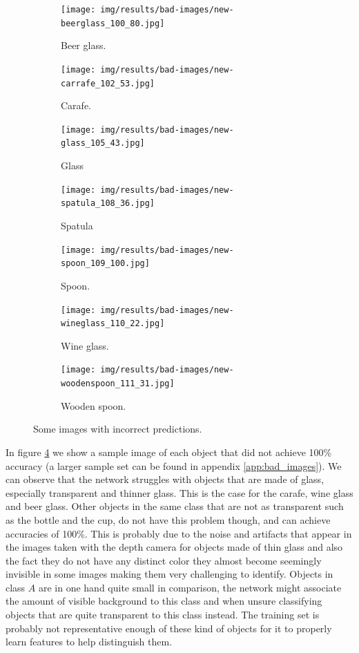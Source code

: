 \begin{figure}
	\centering
	\begin{subfigure}[b]{0.3\textwidth}
		\texttt{[image: img/results/bad-images/new-beerglass\_100\_80.jpg]}
		\caption{Beer glass.}
	\end{subfigure}
	\begin{subfigure}[b]{0.3\textwidth}
		\texttt{[image: img/results/bad-images/new-carrafe\_102\_53.jpg]}
		\caption{Carafe.}
	\end{subfigure}
	\begin{subfigure}[b]{0.3\textwidth}
		\texttt{[image: img/results/bad-images/new-glass\_105\_43.jpg]}
		\caption{Glass}
	\end{subfigure}
	\begin{subfigure}[b]{0.3\textwidth}
		\texttt{[image: img/results/bad-images/new-spatula\_108\_36.jpg]}
		\caption{Spatula}
		\label{fig:results_bad_images__spatula}
	\end{subfigure}
	\begin{subfigure}[b]{0.3\textwidth}
		\texttt{[image: img/results/bad-images/new-spoon\_109\_100.jpg]}
		\caption{Spoon.}
		\label{fig:results_bad_images__spoon}
	\end{subfigure}
	\begin{subfigure}[b]{0.3\textwidth}
		\texttt{[image: img/results/bad-images/new-wineglass\_110\_22.jpg]}
		\caption{Wine glass.}
	\end{subfigure}
	\begin{subfigure}[b]{0.3\textwidth}
		\texttt{[image: img/results/bad-images/new-woodenspoon\_111\_31.jpg]}
		\caption{Wooden spoon.}
		\label{fig:results_bad_images__wooden_spoon}
	\end{subfigure}
	\caption{Some images with incorrect predictions.}
	\label{fig:results_bad_images}
\end{figure}


In figure \ref{fig:results_bad_images} we show a sample image of each object that did not achieve 100\% accuracy (a larger sample set can be found in appendix \ref{app:bad_images}). We can observe that the network struggles with objects that are made of glass, especially transparent and thinner glass. This is the case for the carafe, wine glass and beer glass. Other objects in the same class that are not as transparent such as the bottle and the cup, do not have this problem though, and can achieve accuracies of 100\%. This is probably due to the noise and artifacts that appear in the images taken with the depth camera for objects made of thin glass and also the fact they do not have any distinct color they almost become seemingly invisible in some images making them very challenging to identify. Objects in class \(A\) are in one hand quite small in comparison, the network might associate the amount of visible background to this class and when unsure classifying objects that are quite transparent to this class instead. The training set is probably not representative enough of these kind of objects for it to properly learn features to help distinguish them.

